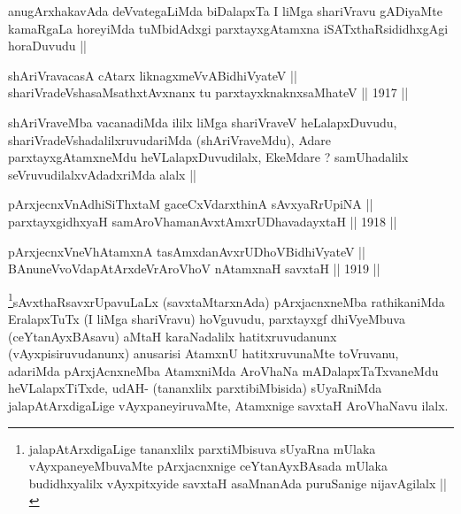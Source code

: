 \begin{artha}
anugArxhakavAda deVvategaLiMda biDalapxTa I liMga shariVravu gADiyaMte
kamaRgaLa horeyiMda tuMbidAdxgi parxtayxgAtamxna iSATxthaRsididhxgAgi
horaDuvudu ||
\end{artha}


\begin{shl}
shAriVravacasA cAtarx liknagxmeVvABidhiVyateV || \\
shariVradeVshasaMsathxtAvxnanx tu parxtayxknaknxsaMhateV ||  1917 ||  
\end{shl}

\begin{artha}
shAriVraveMba vacanadiMda ililx liMga shariVraveV heLalapxDuvudu,
shariVradeVshadalilxruvudariMda (shAriVraveMdu), Adare
parxtayxgAtamxneMdu heVLalapxDuvudilalx, EkeMdare ? samUhadalilx
seVruvudilalxvAdadxriMda alalx ||
\end{artha}


\begin{shl}
pArxjecnxVnAdhiSiThxtaM gaceCxVdarxthinA sAvxyaRrUpiNA || \\
parxtayxgidhxyaH samAroVhamanAvxtAmx\s \s rUDhavadayxtaH ||  1918 ||  
\end{shl}
				
\begin{shl}
pArxjecnxVneVhA\s \s tamxnA tasAmxdanAvxrUDhoV\s BidhiVyateV ||  \\
BAnuneVvoVdapAtArxdeVrAroVhoV nA\s \s tamxnaH savxtaH ||  1919 ||  
\end{shl}

\begin{artha}
\footnote[1]{jalapAtArxdigaLige tananxlilx parxtiMbisuva sUyaRna
  mUlaka vAyxpaneyeMbuvaMte pArxjacnxnige ceYtanAyxBAsada mUlaka
  budidhxyalilx vAyxpitxyide savxtaH asaMnanAda puruSanige
  nijavAgilalx ||}sAvxthaRsavxrUpavuLaLx (savxtaMtarxnAda) pArxjacnxneMba
rathikaniMda EralapxTuTx (I liMga shariVravu) hoVguvudu, parxtayxgf
dhiVyeMbuva (ceYtanAyxBAsavu) aMtaH karaNadalilx hatitxruvudanunx
(vAyxpisiruvudanunx) anusarisi AtamxnU hatitxruvunaMte toVruvanu,
adariMda pArxjAcnxneMba AtamxniMda AroVhaNa mADalapxTaTxvaneMdu
heVLalapxTiTxde, udAH- (tananxlilx parxtibiMbisida) sUyaRniMda
jalapAtArxdigaLige vAyxpaneyiruvaMte, Atamxnige savxtaH AroVhaNavu ilalx. 
\end{artha}

